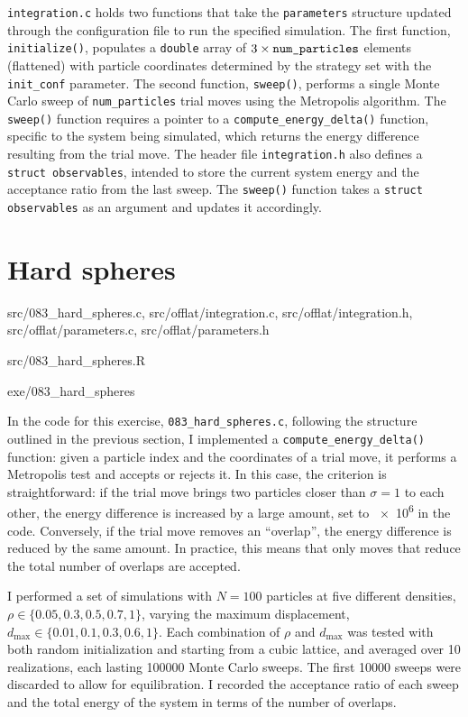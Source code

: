 \texttt{integration.c} holds two functions that take the \texttt{parameters}
structure updated through the configuration file to run the specified
simulation. The first function, \texttt{initialize()}, populates a
\texttt{double} array of $3 \times \text{\texttt{num\_particles}}$ elements
(flattened) with particle coordinates determined by the strategy set with the
\texttt{init\_conf} parameter. The second function, \texttt{sweep()}, performs a
single Monte Carlo sweep of \texttt{num\_particles} trial moves using the
Metropolis algorithm. The \texttt{sweep()} function requires a pointer to a
\texttt{compute\_energy\_delta()} function, specific to the system being
simulated, which returns the energy difference resulting from the trial move.
The header file \texttt{integration.h} also defines a \texttt{struct
observables}, intended to store the current system energy and the acceptance
ratio from the last sweep. The \texttt{sweep()} function takes a \texttt{struct
observables} as an argument and updates it accordingly.

\section{Hard spheres}

\begin{sourcefiles}
  \item[Source codes] src/083\_hard\_spheres.c, src/offlat/integration.c,
    src/offlat/integration.h, src/offlat/parameters.c, src/offlat/parameters.h
  \item[Analysis script] src/083\_hard\_spheres.R
  \item[Executable] exe/083\_hard\_spheres
\end{sourcefiles}

In the code for this exercise, \texttt{083\_hard\_spheres.c}, following the
structure outlined in the previous section, I implemented a
\texttt{compute\_energy\_delta()} function: given a particle index and the
coordinates of a trial move, it performs a Metropolis test and accepts or
rejects it. In this case, the criterion is straightforward: if the trial move
brings two particles closer than $\sigma = 1$ to each other, the energy
difference is increased by a large amount, set to \num{e6} in the code.
Conversely, if the trial move removes an \enquote{overlap}, the energy
difference is reduced by the same amount. In practice, this means that only
moves that reduce the total number of overlaps are accepted.

I performed a set of simulations with $N = \num{100}$ particles at five
different densities, $\rho \in \{ \num{0.05}, \num{0.3}, \num{0.5}, \num{0.7},
\num{1} \}$, varying the maximum displacement, $d_{\mathrm{max}} \in \{
\num{0.01}, \num{0.1}, \num{0.3}, \num{0.6}, \num{1} \}$. Each combination of
$\rho$ and $d_{\mathrm{max}}$ was tested with both random initialization and
starting from a cubic lattice, and averaged over \num{10} realizations, each
lasting \num{100000} Monte Carlo sweeps. The first \num{10000} sweeps were
discarded to allow for equilibration. I recorded the acceptance ratio of each
sweep and the total energy of the system in terms of the number of overlaps.

